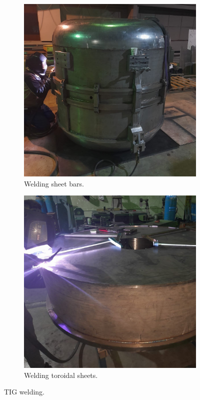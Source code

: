 \documentclass{book}
\begin{document}
\begin{figure}
    \captionsetup[subfigure]{justification=centering}
    \captionsetup{justification=centering}
    \centering
    \begin{subfigure}{.5\textwidth}
      \centering
      \includegraphics[width=.96\linewidth]{../../../figures/manif/welding/rhodo_assembled_welding_cropped.jpeg}
      \caption{Welding sheet bars.}
    \end{subfigure}%
    \centering
    \begin{subfigure}{.5\textwidth}
      \centering
      \includegraphics[width=.96\linewidth]{../../../figures/manif/welding/rhodo_middle_welding_toroidal_sheets_cropped.jpeg}
      \caption{Welding toroidal sheets.}
    \end{subfigure}
    \caption{TIG welding.}
    \label{fig:manif_welding}
\end{figure}
\end{document}
